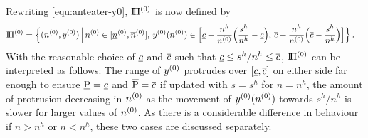 %
Rewriting \eqref{equ:anteater-y0}, $\text{I}\!\Pi^{(0)}$ is now defined by %
\begin{align*}
\PZ &= 
\Big\{ \Big. (\nz, \yz) \,\Big|\, \nz \in [\nzl, \nzu],\, %
                  \yz(\nz) \in \Big[ \cl - \frac{n^h}{\nz}\Big(\frac{s^h}{n^h} - \cl\Big),\,
                                     \cu + \frac{n^h}{\nz}\Big(\cu - \frac{s^h}{n^h}\Big)  \Big] \Big\}\,.
\end{align*}
With the reasonable choice of $\underline{c}$ and $\overline{c}$ such that $\underline{c} \leq s^h/n^h \leq \overline{c}$,
$\text{I}\!\Pi^{(0)}$ can be interpreted as follows: The range of $y^{(0)}$
protrudes over $[\underline{c}, \overline{c}]$
on either side far enough to ensure $\underline{\operatorname{P}} = \underline{c}$ and $\overline{\operatorname{P}} = \overline{c}$ if
updated with $s = s^h$ for $n = n^h$, the amount of protrusion
decreasing in $n^{(0)}$ as the movement of $y^{(0)}(n^{(0)})$ towards $s^h/n^h$ is slower
for larger values of $n^{(0)}$. As there is a considerable difference in behaviour if
$n > n^h$ or $n < n^h$, these two cases are discussed separately.

